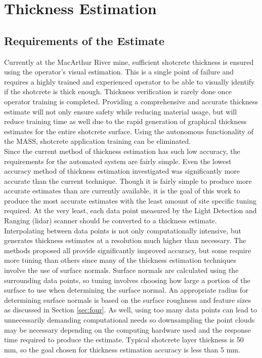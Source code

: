 \chapter{Thickness Estimation}
\label{chap:thick}
\section{Requirements of the Estimate}
Currently at the MacArthur River mine, sufficient shotcrete thickness is ensured using the operator's visual estimation. This is a single point of failure and requires a highly trained and experienced operator to be able to visually identify if the shotcrete is thick enough. Thickness verification is rarely done once operator training is completed. Providing a comprehensive and accurate thickness estimate will not only ensure safety while reducing material usage, but will reduce training time as well due to the rapid generation of graphical thickness estimates for the entire shotcrete surface. Using the autonomous functionality of the MASS, shotcrete application training can be eliminated.\\

Since the current method of thickness estimation has such low accuracy, the requirements for the automated system are fairly simple. Even the lowest accuracy method of thickness estimation investigated was significantly more accurate than the current technique. Though it is fairly simple to produce more accurate estimates than are currently available, it is the goal of this work to produce the most accurate estimates with the least amount of site specific tuning required. At the very least, each data point measured by the Light Detection and Ranging (\acrshort{lidar}) scanner should be converted to a thickness estimate. Interpolating between data points is not only computationally intensive, but generates thickness estimates at a resolution much higher than necessary. The methods proposed all provide significantly improved accuracy, but some require more tuning than others since many of the thickness estimation techniques involve the use of surface normals. Surface normals are calculated using the surrounding data points, so tuning involves choosing how large a portion of the surface to use when determining the surface normal. An appropriate radius for determining surface normals is based on the surface roughness and feature sizes as discussed in Section \ref{sec:four}. As well, using too many data points can lead to unnecessarily demanding computational needs so downsampling the point clouds may be necessary depending on the computing hardware used and the response time required to produce the estimate. Typical shotcrete layer thickness is 50 mm, so the goal chosen for thickness estimation accuracy is less than 5 mm.\\

